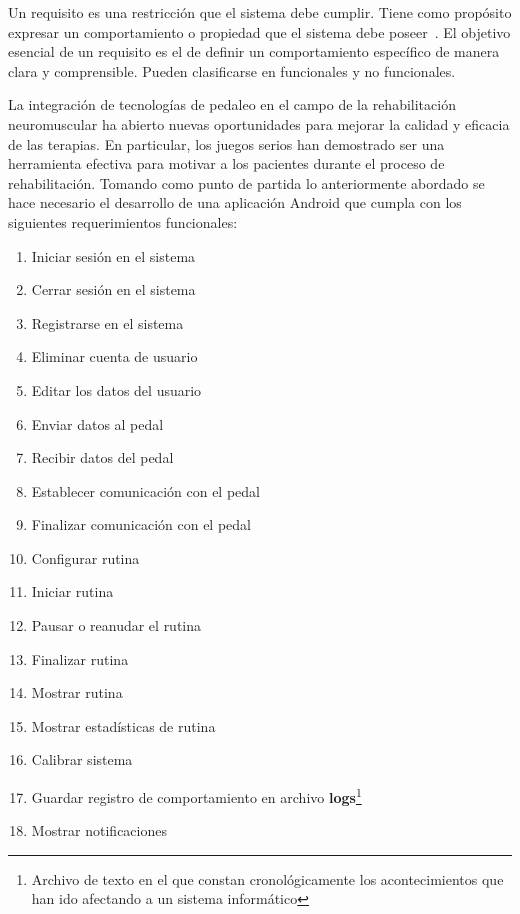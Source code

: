\newpage
{}
Un requisito es una restricción que el sistema debe cumplir. Tiene como propósito expresar un comportamiento o propiedad que el sistema debe poseer~\cite{jacobson2000uml}. El objetivo esencial de un requisito es el de definir un comportamiento específico de manera clara y comprensible. Pueden clasificarse en funcionales y no funcionales.

La integración de tecnologías de pedaleo en el campo de la rehabilitación neuromuscular ha abierto nuevas oportunidades para mejorar la calidad y eficacia de las terapias. En particular, los juegos serios han demostrado ser una herramienta efectiva para motivar a los pacientes durante el proceso de rehabilitación. Tomando como punto de partida lo anteriormente abordado se hace necesario el desarrollo de una aplicación Android que cumpla con los siguientes requerimientos funcionales:    

\begin{enumerate}
    \item Iniciar sesión en el sistema
    \item Cerrar sesión en el sistema
    \item Registrarse en el sistema
    \item Eliminar cuenta de usuario
    \item Editar los datos del usuario
    \item Enviar datos al pedal
    \item Recibir datos del pedal
    \item Establecer comunicación con el pedal
    \item Finalizar comunicación con el pedal
    \item Configurar rutina
    \item Iniciar rutina
    \item Pausar o reanudar el rutina
    \item Finalizar rutina
    \item Mostrar rutina
    \item Mostrar estadísticas de rutina
    \item Calibrar sistema
    \item Guardar registro de comportamiento en archivo \textbf{logs}\footnote{Archivo de texto en el que constan cronológicamente los acontecimientos que han ido afectando a un sistema informático}
    \item Mostrar notificaciones 
\end{enumerate}


